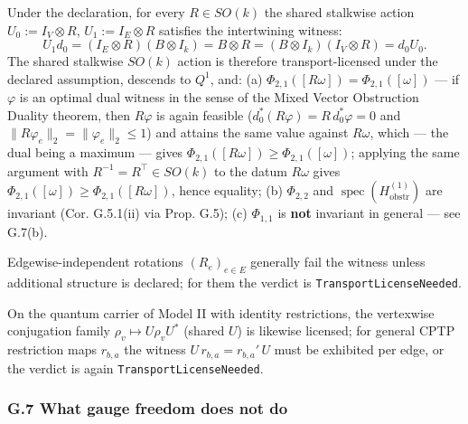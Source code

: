 \documentclass[
  11pt,
]{article}
\begin{document}
Under the declaration, for every \(R\in SO(k)\) the shared stalkwise action \(U_0:=I_V\otimes R\), \(U_1:=I_E\otimes R\) satisfies the intertwining witness:
\[U_1d_0=(I_E\otimes R)(B\otimes I_k)=B\otimes R=(B\otimes I_k)(I_V\otimes R)=d_0U_0 .\]
The shared stalkwise \(SO(k)\) action is therefore transport-licensed under the declared assumption, descends to \(Q^1\), and:
(a) \(\Phi_{2,1}([R\omega])=\Phi_{2,1}([\omega])\) --- if \(\varphi\) is an optimal dual witness in the sense of the Mixed Vector Obstruction Duality theorem, then \(R\varphi\) is again feasible (\(d_0^*(R\varphi)=R\,d_0^*\varphi=0\) and \(\|R\varphi_e\|_2=\|\varphi_e\|_2\le1\)) and attains the same value against \(R\omega\), which --- the dual being a maximum --- gives \(\Phi_{2,1}([R\omega])\ge\Phi_{2,1}([\omega])\); applying the same argument with \(R^{-1}=R^\top\in SO(k)\) to the datum \(R\omega\) gives \(\Phi_{2,1}([\omega])\ge\Phi_{2,1}([R\omega])\), hence equality;
(b) \(\Phi_{2,2}\) and \(\operatorname{spec}(H^{(1)}_{\mathrm{obstr}})\) are invariant (Cor. G.5.1(ii) via Prop. G.5);
(c) \(\Phi_{1,1}\) is \textbf{not} invariant in general --- see G.7(b).

Edgewise-independent rotations \((R_e)_{e\in E}\) generally fail the witness unless additional structure is declared; for them the verdict is \texttt{TransportLicenseNeeded}.

On the quantum carrier of Model II with identity restrictions, the vertexwise conjugation family \(\rho_v\mapsto U\rho_vU^*\) (shared \(U\)) is likewise licensed; for general CPTP restriction maps \(r_{b,a}\) the witness \(U\,r_{b,a}=r_{b,a}'\,U\) must be exhibited per edge, or the verdict is again \texttt{TransportLicenseNeeded}.

\subsubsection{G.7 What gauge freedom does not do}\label{g.7-what-gauge-freedom-does-not-do}
\end{document}
